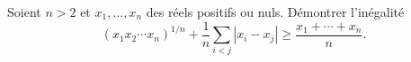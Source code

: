 Soient $n > 2$ et $x_1, \ldots, x_n$ des réels positifs ou nuls. Démontrer l'inégalité
\[ (x_1x_2 \cdots x_n)^{1/n} + \frac{1}{n}\sum_{i<j} |x_i - x_j| \geq \frac{x_1 + \cdots + x_n}{n}. \]
